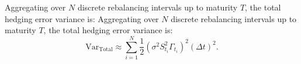 \documentclass{article}
\begin{document}
Aggregating over $N$ discrete rebalancing intervals up to maturity $T$, the total hedging error variance is:
Aggregating over $N$ discrete rebalancing intervals up to maturity $T$, the total hedging error variance is:
\[
\text{Var}_{\text{Total}} \approx \sum_{i=1}^{N} 
\frac{1}{2} \left( \sigma^2 S_{t_i}^2 \Gamma_{t_i} \right)^2 (\Delta t)^2.
\]





\end{document}
